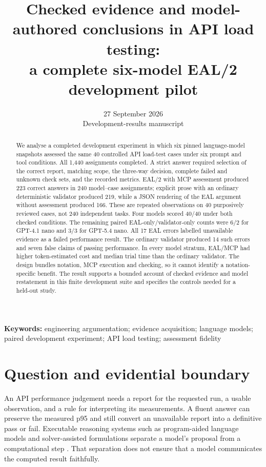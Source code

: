 \documentclass[11pt,a4paper]{article}
\title{Checked evidence and model-authored conclusions in API load testing:\\
  a complete six-model EAL/2 development pilot}
\author{}
\date{27 September 2026\\Development-results manuscript}
\begin{document}
\maketitle

\begin{abstract}
We analyse a completed development experiment in which six pinned language-model snapshots assessed the same 40 controlled API load-test cases under six prompt and tool conditions. All 1,440 assignments completed. A strict answer required selection of the correct report, matching scope, the three-way decision, complete failed and unknown check sets, and the recorded metrics. EAL/2 with MCP assessment produced 223 correct answers in 240 model--case assignments; explicit prose with an ordinary deterministic validator produced 219, while a JSON rendering of the EAL argument without assessment produced 166. These are repeated observations on 40 purposively reviewed cases, not 240 independent tasks. Four models scored 40/40 under both checked conditions. The remaining paired EAL-only/validator-only counts were 6/2 for GPT-4.1 nano and 3/3 for GPT-5.4 nano. All 17 EAL errors labelled unavailable evidence as a failed performance result. The ordinary validator produced 14 such errors and seven false claims of passing performance. In every model stratum, EAL/MCP had higher token-estimated cost and median trial time than the ordinary validator. The design bundles notation, MCP execution and checking, so it cannot identify a notation-specific benefit. The result supports a bounded account of checked evidence and model restatement in this finite development suite and specifies the controls needed for a held-out study.
\end{abstract}
\noindent\textbf{Keywords:} engineering argumentation; evidence acquisition; language models; paired development experiment; API load testing; assessment fidelity

\section{Question and evidential boundary}
An API performance judgement needs a report for the requested run, a usable observation, and a rule for interpreting its measurements. A fluent answer can preserve the measured p95 and still convert an unavailable report into a definitive pass or fail. Executable reasoning systems such as program-aided language models and solver-assisted formulations separate a model's proposal from a computational step \citep{gao2023,pan2023}. That separation does not ensure that a model communicates the computed result faithfully.
\end{document}
